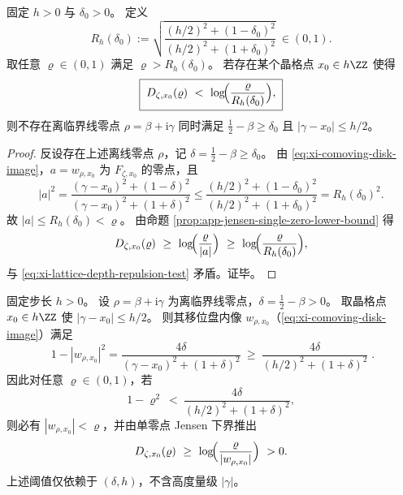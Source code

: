 \begin{corollary}[有限深度排斥的晶格证书]\label{cor:xi-lattice-local-depth-repulsion}
固定 \(h>0\) 与 \(\delta_0>0\)。
定义
\begin{equation}\label{eq:xi-lattice-depth-repulsion-Rh}
\boxed{\;
R_h(\delta_0)
:=\sqrt{\frac{(h/2)^2+(1-\delta_0)^2}{(h/2)^2+(1+\delta_0)^2}}\ \in(0,1).\;}
\end{equation}
取任意 \(\varrho\in(0,1)\) 满足 \(\varrho>R_h(\delta_0)\)。
若存在某个晶格点 \(x_0\in h\ZZ\) 使得
\begin{equation}\label{eq:xi-lattice-depth-repulsion-test}
\boxed{\;
D_{\zeta,x_0}(\varrho)\ <\ \log\!\Bigl(\frac{\varrho}{R_h(\delta_0)}\Bigr),\;}
\end{equation}
则不存在离临界线零点 \(\rho=\beta+\mathrm{i}\gamma\) 同时满足 \(\tfrac12-\beta\ge \delta_0\) 且 \(|\gamma-x_0|\le h/2\)。
\end{corollary}

\begin{proof}
反设存在上述离线零点 \(\rho\)，记 \(\delta=\tfrac12-\beta\ge\delta_0\)。
由 \eqref{eq:xi-comoving-disk-image}，\(a=w_{\rho,x_0}\) 为 \(F_{\zeta,x_0}\) 的零点，且
\[
|a|^2=\frac{(\gamma-x_0)^2+(1-\delta)^2}{(\gamma-x_0)^2+(1+\delta)^2}
\le
\frac{(h/2)^2+(1-\delta_0)^2}{(h/2)^2+(1+\delta_0)^2}
=R_h(\delta_0)^2.
\]
故 \(|a|\le R_h(\delta_0)<\varrho\)。
由命题 \ref{prop:app-jensen-single-zero-lower-bound} 得
\[
D_{\zeta,x_0}(\varrho)\ \ge\ \log\!\Bigl(\frac{\varrho}{|a|}\Bigr)\ \ge\ \log\!\Bigl(\frac{\varrho}{R_h(\delta_0)}\Bigr),
\]
与 \eqref{eq:xi-lattice-depth-repulsion-test} 矛盾。证毕。
\end{proof}

\begin{proposition}[晶格共动的去高度化可见性]\label{prop:xi-lattice-deheightized-visibility}
固定步长 \(h>0\)。
设 \(\rho=\beta+\mathrm{i}\gamma\) 为离临界线零点，\(\delta=\tfrac12-\beta>0\)。
取晶格点 \(x_0\in h\ZZ\) 使 \(|\gamma-x_0|\le h/2\)。
则其移位盘内像 \(w_{\rho,x_0}\)（\eqref{eq:xi-comoving-disk-image}）满足
\begin{equation}\label{eq:xi-lattice-visibility-lowerbound}
\boxed{\;
1-|w_{\rho,x_0}|^2
=\frac{4\delta}{(\gamma-x_0)^2+(1+\delta)^2}
\ \ge\
\frac{4\delta}{(h/2)^2+(1+\delta)^2}\; }.
\end{equation}
因此对任意 \(\varrho\in(0,1)\)，若
\begin{equation}\label{eq:xi-lattice-visibility-threshold}
1-\varrho^2\ <\ \frac{4\delta}{(h/2)^2+(1+\delta)^2},
\end{equation}
则必有 \(|w_{\rho,x_0}|<\varrho\)，并由单零点 Jensen 下界推出
\[
D_{\zeta,x_0}(\varrho)\ \ge\ \log\!\Bigl(\frac{\varrho}{|w_{\rho,x_0}|}\Bigr)\ >0.
\]
上述阈值仅依赖于 \((\delta,h)\)，不含高度量级 \(|\gamma|\)。
\end{proposition}

